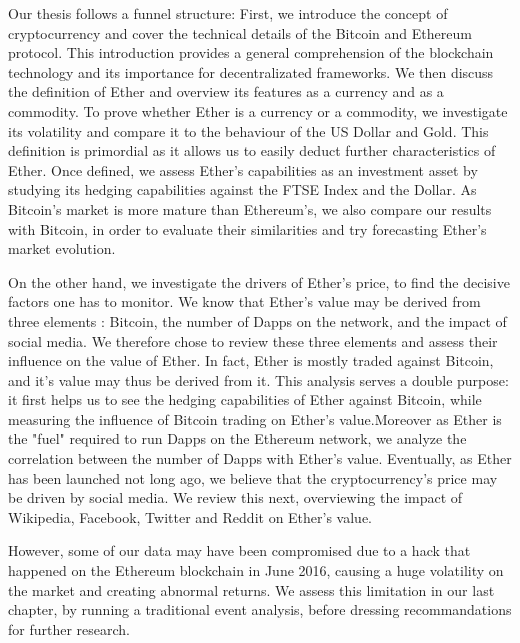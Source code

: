 \documentclass[11pt]{report}
\begin{document}
Our thesis follows a funnel structure: \newline
First, we introduce the concept of cryptocurrency and cover the technical details of the Bitcoin and Ethereum protocol. This introduction provides a general comprehension of the blockchain technology and its importance for decentralizated frameworks.\newline
We then discuss the definition of Ether and overview its features as a currency and as a commodity. To prove whether Ether is a currency or a commodity, we investigate its volatility and compare it to the behaviour of the US Dollar and Gold. This definition  is primordial as it allows us to easily deduct further characteristics of Ether.\newline 
Once defined, we assess Ether's capabilities as an investment asset by studying its hedging capabilities against the FTSE Index and the Dollar. As Bitcoin's market is more mature than Ethereum's,  we also compare our results with Bitcoin, in order to evaluate their similarities and try forecasting Ether's market evolution. \newline
 
On the other hand, we investigate the drivers of Ether’s price, to find the decisive factors one has to monitor. We know that Ether's value may be derived from three elements : Bitcoin, the number of Dapps on the network, and the impact of social media. We therefore chose to review these three elements and assess their influence on the value of Ether. In fact, Ether is mostly traded against Bitcoin, and it's value may thus be derived from it. This analysis serves a double purpose: it first helps us to see the hedging capabilities of Ether against Bitcoin, while measuring the influence of Bitcoin trading on Ether's value.\newline Moreover as Ether is the "fuel" required to run Dapps on the Ethereum network, we analyze the correlation between the number of Dapps with Ether's value.\newline
Eventually, as Ether has been launched not long ago, we believe that the cryptocurrency's price may be driven by social media. We review this next, overviewing the impact of Wikipedia, Facebook, Twitter and Reddit on Ether's value. \newline

However, some of our data may have been compromised due to a hack that happened on the Ethereum blockchain in June 2016, causing a huge volatility on the market and creating abnormal returns. We assess this limitation in our last chapter, by running a traditional event analysis, before dressing recommandations for further research.
\end{document}
